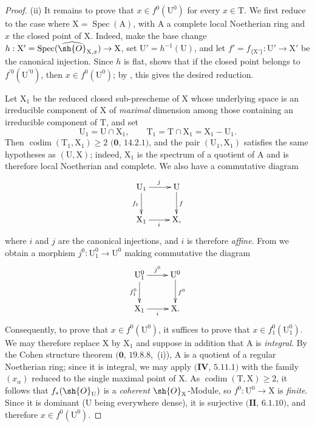 \begin{proof}

(ii) It remains to prove that $x\in f^0(\mathrm{U}^0)$ for every $x\in\mathrm{T}$.
We first reduce to the case where $\mathrm{X}=\operatorname{Spec}(\mathrm{A})$, with $\mathrm{A}$ a complete local Noetherian ring and $x$ the closed point of $\mathrm{X}$.
Indeed, make the base change $h:\mathrm{X}'=\operatorname{Spec}(\widehat{\sh{O}}_{\mathrm{X},x})\to\mathrm{X}$, set $\mathrm{U}'=h^{-1}(\mathrm{U})$, and let $f'=f_{\{\mathrm{X}'\}}:\mathrm{U}'\to\mathrm{X}'$ be the canonical injection.
Since $h$ is flat,  shows that if the closed point belongs to $f^{\prime 0}(\mathrm{U}^{\prime 0})$, then $x\in f^0(\mathrm{U}^0)$; by , this gives the desired reduction.

Let $\mathrm{X}_1$ be the reduced closed sub-prescheme of $\mathrm{X}$ whose underlying space is an irreducible component of $\mathrm{X}$ of \emph{maximal} dimension among those containing an irreducible component of $\mathrm{T}$, and set
\[
  \mathrm{U}_1=\mathrm{U}\cap\mathrm{X}_1,
  \qquad
  \mathrm{T}_1=\mathrm{T}\cap\mathrm{X}_1=\mathrm{X}_1-\mathrm{U}_1.
\]
Then $\operatorname{codim}(\mathrm{T}_1,\mathrm{X}_1)\geq 2$ $(\mathbf{0}$, $14.2.1)$, and the pair $(\mathrm{U}_1,\mathrm{X}_1)$ satisfies the same hypotheses as $(\mathrm{U},\mathrm{X})$; indeed, $\mathrm{X}_1$ is the spectrum of a quotient of $\mathrm{A}$ and is therefore local Noetherian and complete.
We also have a commutative diagram
\[
  \xymatrix{
    \mathrm{U}_1 \ar[r]^j \ar[d]_{f_1} & \mathrm{U} \ar[d]^f \\
    \mathrm{X}_1 \ar[r]_i & \mathrm{X},
  }
\]
where $i$ and $j$ are the canonical injections, and $i$ is therefore \emph{affine}.  From  we obtain a morphism $j^0:\mathrm{U}_1^0\to\mathrm{U}^0$ making commutative the diagram
\[
  \xymatrix{
    \mathrm{U}_1^0 \ar[r]^{j^0} \ar[d]_{f_1^0} & \mathrm{U}^0 \ar[d]^{f^0} \\
    \mathrm{X}_1 \ar[r]_i & \mathrm{X}.
  }
\]
Consequently, to prove that $x\in f^0(\mathrm{U}^0)$, it suffices to prove that $x\in f_1^0(\mathrm{U}_1^0)$.
We may therefore replace $\mathrm{X}$ by $\mathrm{X}_1$ and suppose in addition that $\mathrm{A}$ is \emph{integral}.
By the Cohen structure theorem $(\mathbf{0}$, $19.8.8$,~(i)), $\mathrm{A}$ is a quotient of a regular Noetherian ring; since it is integral, we may apply $(\mathbf{IV}$, $5.11.1)$ with the family $(x_\alpha)$ reduced to the single maximal point of $\mathrm{X}$.
As $\operatorname{codim}(\mathrm{T},\mathrm{X})\geq 2$, it follows that $f_*(\sh{O}_{\mathrm{U}})$ is a \emph{coherent} $\sh{O}_{\mathrm{X}}$-Module, so $f^0:\mathrm{U}^0\to\mathrm{X}$ is \emph{finite}.  Since it is dominant ($\mathrm{U}$ being everywhere dense), it is surjective $(\mathbf{II}$, $6.1.10)$, and therefore $x\in f^0(\mathrm{U}^0)$.
\end{proof}

